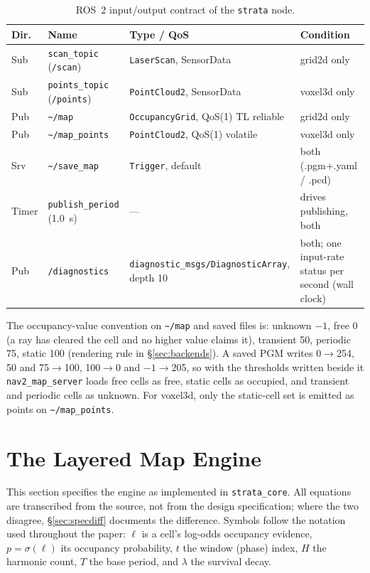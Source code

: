 \documentclass[conference]{IEEEtran}
\begin{document}
\begin{table}[t]
\centering
\caption{ROS~2 input/output contract of the \texttt{strata} node.}
\label{tbl:io}
\footnotesize
\begin{tabular}{@{}p{}p{}p{}p{}@{}}
\toprule
Dir. & Name & Type / QoS & Condition \\
\midrule
Sub & \texttt{scan\_topic} (\texttt{/scan}) & \texttt{LaserScan}, SensorData & grid2d only \\
Sub & \texttt{points\_topic} (\texttt{/points}) & \texttt{PointCloud2}, SensorData & voxel3d only \\
Pub & \texttt{\textasciitilde/map} & \texttt{OccupancyGrid}, QoS(1) TL reliable & grid2d only \\
Pub & \texttt{\textasciitilde/map\_points} & \texttt{PointCloud2}, QoS(1) volatile & voxel3d only \\
Srv & \texttt{\textasciitilde/save\_map} & \texttt{Trigger}, default & both (.pgm+.yaml / .pcd) \\
Timer & \texttt{publish\_period} (1.0~s) & --- & drives publishing, both \\
Pub & \texttt{/diagnostics} & \texttt{diagnostic\_msgs/DiagnosticArray}, depth 10 & both; one input-rate status per second (wall clock) \\
\bottomrule
\end{tabular}
\end{table}

The occupancy-value convention on \texttt{\textasciitilde/map} and saved files is: unknown $-1$,
free 0 (a ray has cleared the cell and no higher value claims it), transient
50, periodic 75, static 100 (rendering rule in \S\ref{sec:backends}). A saved PGM
writes 0$\to$254, 50 and 75$\to$100, 100$\to$0 and $-1\to$205, so with the
thresholds written beside it \texttt{nav2\_map\_server} loads free cells as
free, static cells as occupied, and transient and periodic cells as unknown. For voxel3d, only the static-cell
set is emitted as points on \texttt{\textasciitilde/map\_points}.

\section{The Layered Map Engine}
\label{sec:method}

This section specifies the engine as implemented in \texttt{strata\_core}. All
equations are transcribed from the source, not from the design specification;
where the two disagree, \S\ref{sec:specdiff} documents the difference. Symbols follow
the notation used throughout the paper: $\ell$ is a cell's log-odds occupancy
evidence, $p=\sigma(\ell)$ its occupancy probability, $t$ the window (phase)
index, $H$ the harmonic count, $T$ the base period, and $\lambda$ the survival
decay.
\end{document}
